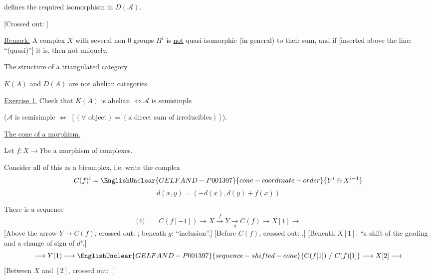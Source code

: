 

defines the required isomorphism in $D(\mathcal A)$.

[Crossed out:
]

\underline{Remark.} A complex $X$ with several non-$0$ groups $H^i$
is \underline{not} quasi-isomorphic (in general) to their sum, and if
[inserted above the line: ``(quasi)''] it is, then not uniquely.


\underline{The structure of a triangulated category}

$K(A)$ and $D(A)$ are not abelian categories.

\underline{Exercise 1.} Check that
$K(A)$ is abelian $\Longleftrightarrow\mathcal A$ is semisimple

($\mathcal A$ is semisimple $\Longleftrightarrow$
$[(\forall\text{ object})=(\text{a direct sum of irreducibles})]$).

\underline{The cone of a morphism.}

Let $f:X\longrightarrow Y$\quad be a morphism of complexes.


Consider all of this as a bicomplex, i.e.
write the complex
\begin{equation*}
C(f)^i=\EnglishUnclear{GELFAND-P001397}{cone-coordinate-order}{Y^i\oplus X^{i+1}}
\end{equation*}
\begin{equation*}
d(x,y)=(-d(x),d(y)+f(x))
\end{equation*}

There is a sequence
\begin{equation*}
\text{(4)}\qquad
C(f[-1])\longrightarrow X\overset{f}{\longrightarrow}Y
\underset{g}{\longrightarrow}C(f)\longrightarrow X[1]\longrightarrow
\end{equation*}
[Above the arrow $Y\to C(f)$, crossed out:
;
beneath $g$: ``inclusion''.]
[Before $C(f)$, crossed out:
.]
[Beneath $X[1]$: ``a shift of the grading and a change of sign of $d$''.]
\begin{equation*}
\longrightarrow Y(1)\longrightarrow
\EnglishUnclear{GELFAND-P001397}{sequence-shifted-cone}{C(f[1])\text{ / }C(f)[1]}
\longrightarrow X[2]\longrightarrow
\end{equation*}
[Between $X$ and $[2]$, crossed out:
.]

